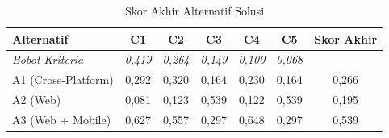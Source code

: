 \begin{table}[H]
\centering
\caption{Skor Akhir Alternatif Solusi}
\label{tab:ahp-skor-akhir}
\begin{tabular}{|l|c|c|c|c|c|c|}
\hline
\textbf{Alternatif} & \textbf{C1} & \textbf{C2} & \textbf{C3} & \textbf{C4} & \textbf{C5} & \textbf{Skor Akhir} \\
\hline
\textit{Bobot Kriteria} & \textit{0,419} & \textit{0,264} & \textit{0,149} & \textit{0,100} & \textit{0,068} & \\
\hline
A1 (Cross-Platform) & 0,292 & 0,320 & 0,164 & 0,230 & 0,164 & 0,266 \\
A2 (Web)            & 0,081 & 0,123 & 0,539 & 0,122 & 0,539 & 0,195 \\
A3 (Web + Mobile)   & 0,627 & 0,557 & 0,297 & 0,648 & 0,297 & 0,539 \\
\hline
\end{tabular}
\end{table}